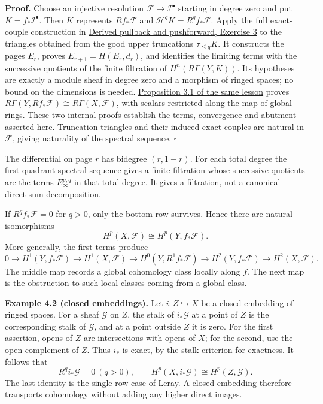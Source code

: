 \documentclass[11pt]{article}
\begin{document}
\textbf{Proof.} Choose an injective resolution
\(\mathcal F\to\mathcal I^\bullet\) starting in degree zero and put
\(K=f_*\mathcal I^\bullet\). Then \(K\) represents \(Rf_*\mathcal F\)
and \(\mathcal H^qK=R^qf_*\mathcal F\). Apply the full exact-couple
construction in
\href{../derived-categories-and-sheaf-operations/derived-pullback-and-pushforward.html\#6-exercises-with-checked-solutions}{Derived
pullback and pushforward, Exercise 3} to the triangles obtained from the
good upper truncations \(\tau_{\le q}K\). It constructs the pages
\(E_r\), proves \(E_{r+1}=H(E_r,d_r)\), and identifies the limiting
terms with the successive quotients of the finite filtration of
\(H^n(R\Gamma(Y,K))\). Its hypotheses are exactly a module sheaf in
degree zero and a morphism of ringed spaces; no bound on the dimensions
is needed.
\href{../derived-categories-and-sheaf-operations/derived-pullback-and-pushforward.html\#3-composition-leray-and-the-local-descriptions}{Proposition
3.1 of the same lesson} proves
\(R\Gamma(Y,Rf_*\mathcal F)\cong R\Gamma(X,\mathcal F)\), with scalars
restricted along the map of global rings. These two internal proofs
establish the terms, convergence and abutment asserted here. Truncation
triangles and their induced exact couples are natural in \(\mathcal F\),
giving naturality of the spectral sequence. \(\square\)

The differential on page \(r\) has bidegree \((r,1-r)\). For each total
degree the first-quadrant spectral sequence gives a finite filtration
whose successive quotients are the terms \(E_\infty^{p,q}\) in that
total degree. It gives a filtration, not a canonical direct-sum
decomposition.

If \(R^qf_*\mathcal F=0\) for \(q>0\), only the bottom row survives.
Hence there are natural isomorphisms \[
H^p(X,\mathcal F)\cong H^p(Y,f_*\mathcal F).
\] More generally, the first terms produce \[
0\to H^1(Y,f_*\mathcal F)\to H^1(X,\mathcal F)
\to H^0(Y,R^1f_*\mathcal F)\to H^2(Y,f_*\mathcal F)
\to H^2(X,\mathcal F).
\] The middle map records a global cohomology class locally along \(f\).
The next map is the obstruction to such local classes coming from a
global class.

\textbf{Example 4.2 (closed embeddings).} Let \(i:Z\hookrightarrow X\)
be a closed embedding of ringed spaces. For a sheaf \(\mathcal G\) on
\(Z\), the stalk of \(i_*\mathcal G\) at a point of \(Z\) is the
corresponding stalk of \(\mathcal G\), and at a point outside \(Z\) it
is zero. For the first assertion, opens of \(Z\) are intersections with
opens of \(X\); for the second, use the open complement of \(Z\). Thus
\(i_*\) is exact, by the stalk criterion for exactness. It follows that
\[
R^qi_*\mathcal G=0\ (q>0),\qquad
H^p(X,i_*\mathcal G)\cong H^p(Z,\mathcal G).
\] The last identity is the single-row case of Leray. A closed embedding
therefore transports cohomology without adding any higher direct images.
\end{document}
